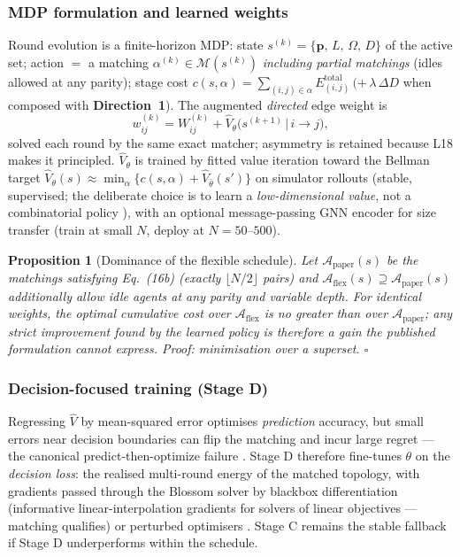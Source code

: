 \documentclass[11pt,a4paper]{article}
\newtheorem{proposition}{Proposition}
\newcommand{\Dir}[1]{\textcolor{accent}{\textbf{Direction~#1}}}
\begin{document}
\subsubsection{MDP formulation and learned weights}
Round evolution is a finite-horizon MDP: state $s^{(k)}=\{\mathbf p,\,L,\,\Omega,\,D\}$ of the active set; action $=$ a matching $\alpha^{(k)}\in\mathcal M(s^{(k)})$ \emph{including partial matchings} (idles allowed at any parity); stage cost $c(s,\alpha)=\sum_{(i,j)\in\alpha}E^{\mathrm{total}}_{(i,j)}\,(+\,\lambda\,\Delta D$ when composed with \Dir{1}). The augmented \emph{directed} edge weight is
\begin{equation}
w^{(k)}_{ij}=W^{(k)}_{ij}+\hat V_\theta\big(s^{(k+1)}\,\big|\,i\to j\big),
\label{eq:learnedw}
\end{equation}
solved each round by the same exact matcher; asymmetry is retained because L18 makes it principled. $\hat V_\theta$ is trained by fitted value iteration toward the Bellman target $\hat V_\theta(s)\approx\min_\alpha\{c(s,\alpha)+\hat V_{\bar\theta}(s')\}$ on simulator rollouts (stable, supervised; the deliberate choice is to learn a \emph{low-dimensional value}, not a combinatorial policy \cite{khalil,shen}), with an optional message-passing GNN encoder for size transfer (train at small $N$, deploy at $N{=}50$--$500$).

\begin{proposition}[Dominance of the flexible schedule]\label{prop:dominance}
Let $\mathcal A_{\mathrm{paper}}(s)$ be the matchings satisfying Eq.~(16b) (exactly $\lfloor N/2\rfloor$ pairs) and $\mathcal A_{\mathrm{flex}}(s)\supseteq\mathcal A_{\mathrm{paper}}(s)$ additionally allow idle agents at any parity and variable depth. For identical weights, the optimal cumulative cost over $\mathcal A_{\mathrm{flex}}$ is no greater than over $\mathcal A_{\mathrm{paper}}$; any strict improvement found by the learned policy is therefore a gain the published formulation cannot express. \emph{Proof:} minimisation over a superset. \hfill$\square$
\end{proposition}

\subsubsection{Decision-focused training (Stage D)}
Regressing $\hat V$ by mean-squared error optimises \emph{prediction} accuracy, but small errors near decision boundaries can flip the matching and incur large regret --- the canonical predict-then-optimize failure \cite{spo,mandi}. Stage D therefore fine-tunes $\theta$ on the \emph{decision loss}: the realised multi-round energy of the matched topology, with gradients passed through the Blossom solver by blackbox differentiation \cite{vlastelica} (informative linear-interpolation gradients for solvers of linear objectives --- matching qualifies) or perturbed optimisers \cite{berthet}. Stage C remains the stable fallback if Stage D underperforms within the schedule.
\end{document}
